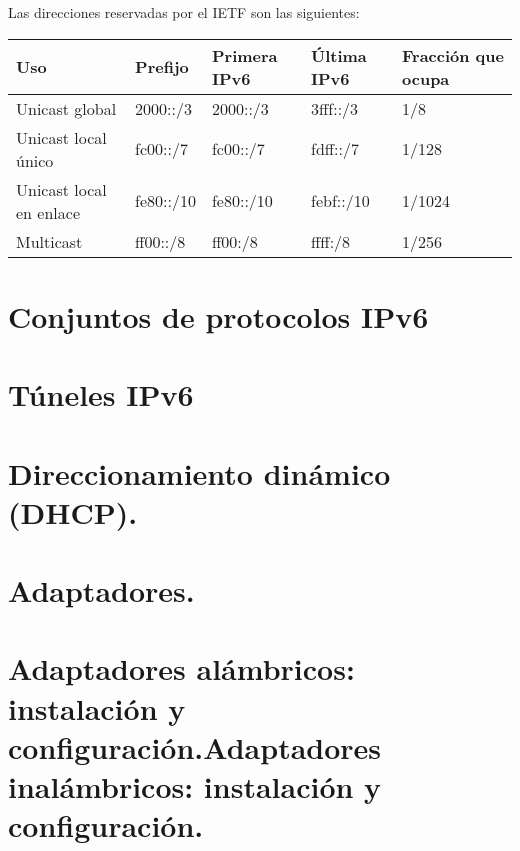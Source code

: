 \documentclass[letterpaper,10pt,spanish]{sphinxmanual}
\begin{document}
Las direcciones reservadas por el IETF son las siguientes:


\begin{savenotes}\sphinxattablestart
\centering
\begin{tabulary}{\linewidth}[t]{|T|T|T|T|T|}
\hline
\sphinxstyletheadfamily 
Uso
&\sphinxstyletheadfamily 
Prefijo
&\sphinxstyletheadfamily 
Primera IPv6
&\sphinxstyletheadfamily 
Última IPv6
&\sphinxstyletheadfamily 
Fracción que ocupa
\\
\hline
Unicast global
&
2000::/3
&
2000::/3
&
3fff::/3
&
1/8
\\
\hline
Unicast local
único
&
fc00::/7
&
fc00::/7
&
fdff::/7
&
1/128
\\
\hline
Unicast local
en enlace
&
fe80::/10
&
fe80::/10
&
febf::/10
&
1/1024
\\
\hline
Multicast
&
ff00::/8
&
ff00:/8
&
ffff:/8
&
1/256
\\
\hline
\end{tabulary}
\par
\sphinxattableend\end{savenotes}


\section{Conjuntos de protocolos IPv6}
\label{\detokenize{t2_integracion_elementos/apuntes_t2:conjuntos-de-protocolos-ipv6}}

\section{Túneles IPv6}
\label{\detokenize{t2_integracion_elementos/apuntes_t2:tuneles-ipv6}}

\section{Direccionamiento dinámico (DHCP).}
\label{\detokenize{t2_integracion_elementos/apuntes_t2:direccionamiento-dinamico-dhcp}}

\section{Adaptadores.}
\label{\detokenize{t2_integracion_elementos/apuntes_t2:adaptadores}}

\section{Adaptadores alámbricos: instalación y configuración.Adaptadores inalámbricos: instalación y configuración.}
\label{\detokenize{t2_integracion_elementos/apuntes_t2:adaptadores-alambricos-instalacion-y-configuracion-adaptadores-inalambricos-instalacion-y-configuracion}}
\end{document}
